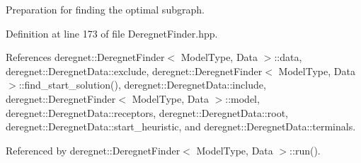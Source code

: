 Preparation for finding the optimal subgraph. 



Definition at line 173 of file Deregnet\+Finder.\+hpp.



References deregnet\+::\+Deregnet\+Finder$<$ Model\+Type, Data $>$\+::data, deregnet\+::\+Deregnet\+Data\+::exclude, deregnet\+::\+Deregnet\+Finder$<$ Model\+Type, Data $>$\+::find\+\_\+start\+\_\+solution(), deregnet\+::\+Deregnet\+Data\+::include, deregnet\+::\+Deregnet\+Finder$<$ Model\+Type, Data $>$\+::model, deregnet\+::\+Deregnet\+Data\+::receptors, deregnet\+::\+Deregnet\+Data\+::root, deregnet\+::\+Deregnet\+Data\+::start\+\_\+heuristic, and deregnet\+::\+Deregnet\+Data\+::terminals.



Referenced by deregnet\+::\+Deregnet\+Finder$<$ Model\+Type, Data $>$\+::run().


